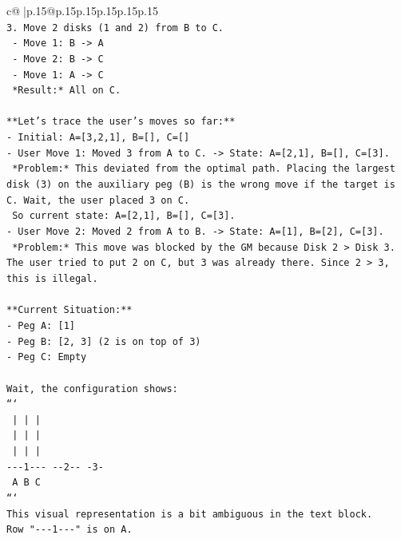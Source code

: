 \documentclass{article}
\begin{document}
{\begin{supertabular}{c@{$\;$}|p{.15\linewidth}@{}p{.15\linewidth}p{.15\linewidth}p{.15\linewidth}p{.15\linewidth}p{.15\linewidth}}
{{{\\ 
\texttt{3. Move 2 disks (1 and 2) from B to C.} \\
\texttt{   {-} Move 1: B {-}> A} \\
\texttt{   {-} Move 2: B {-}> C} \\
\texttt{   {-} Move 1: A {-}> C} \\
\texttt{   *Result:* All on C.} \\
\\ 
\texttt{**Let's trace the user's moves so far:**} \\
\texttt{{-} Initial: A={[}3,2,1{]}, B={[}{]}, C={[}{]}} \\
\texttt{{-} User Move 1: Moved 3 from A to C. {-}> State: A={[}2,1{]}, B={[}{]}, C={[}3{]}.} \\
\texttt{  *Problem:* This deviated from the optimal path. Placing the largest disk (3) on the auxiliary peg (B) is the wrong move if the target is C. Wait, the user placed 3 on C.} \\
\texttt{  So current state: A={[}2,1{]}, B={[}{]}, C={[}3{]}.} \\
\texttt{{-} User Move 2: Moved 2 from A to B. {-}> State: A={[}1{]}, B={[}2{]}, C={[}3{]}.} \\
\texttt{  *Problem:* This move was blocked by the GM because Disk 2 > Disk 3. The user tried to put 2 on C, but 3 was already there. Since 2 > 3, this is illegal.} \\
\\ 
\texttt{**Current Situation:**} \\
\texttt{{-} Peg A: {[}1{]}} \\
\texttt{{-} Peg B: {[}2, 3{]} (2 is on top of 3)} \\
\texttt{{-} Peg C: Empty} \\
\\ 
\texttt{Wait, the configuration shows:} \\
\texttt{```} \\
\texttt{   |       |       |   } \\
\texttt{   |       |       |   } \\
\texttt{   |       |       |   } \\
\texttt{{-}{-}{-}1{-}{-}{-}  {-}{-}2{-}{-}    {-}3{-}  } \\
\texttt{   A       B       C   } \\
\texttt{```} \\
\texttt{This visual representation is a bit ambiguous in the text block.} \\
\texttt{Row "{-}{-}{-}1{-}{-}{-}" is on A.} \\
}}}
\end{supertabular}}
\end{document}
